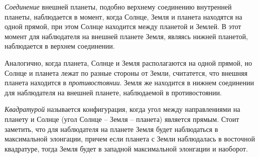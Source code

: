 {\itshape Соединение} внешней планеты, подобно верхнему соединению внутренней 
планеты, наблюдается в момент, когда Солнце, Земля и планета находятся на одной 
прямой, при этом Солнце находится между планетой и Землей. В этот момент для 
наблюдателя на внешней планете Земля, являясь нижней планетой, наблюдается в 
верхнем соединении.

Аналогично, когда планета, Солнце и Земля располагаются на одной прямой, но 
Солнце и планета лежат по разные стороны от Земли, считатется, что внешняя 
планета находится в {\itshape противостоянии}. Земля же находится в нижнем 
соединении для наблюдателя на внешней планете, наблюдаемой в противостоянии.

{\itshape Квадратурой} называется конфигурация, когда угол между направлениями 
на планету и Солнце (угол Солнце -- Земля -- планета) является прямым. Стоит 
заметить, что для наблюдателя на планете Земля будет наблюдаться в максимальной 
элонгации, причем если планета с Земли наблюдалась в восточной квадратуре, 
тогда Земля будет в западной максимальной элонгации и наоборот.
